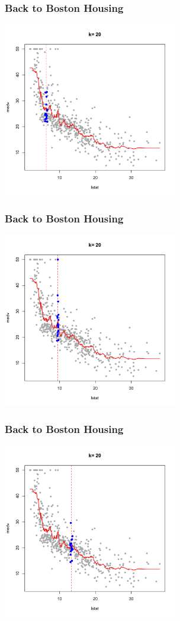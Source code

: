 \documentclass[flegn]{beamer}
\begin{document}
\begin{frame}
\frametitle{Back to Boston Housing}

\vspace{-0.7cm}
\begin{center}
\includegraphics[width=3in]{k20-2}
\end{center}
\end{frame}
\begin{frame}
\frametitle{Back to Boston Housing}

\vspace{-0.7cm}
\begin{center}
\includegraphics[width=3in]{k20-3}
\end{center}
\end{frame}
\begin{frame}
\frametitle{Back to Boston Housing}
\vspace{-0.7cm}
\begin{center}
\includegraphics[width=3in]{k20-4}
\end{center}
\end{frame}
\end{document}
